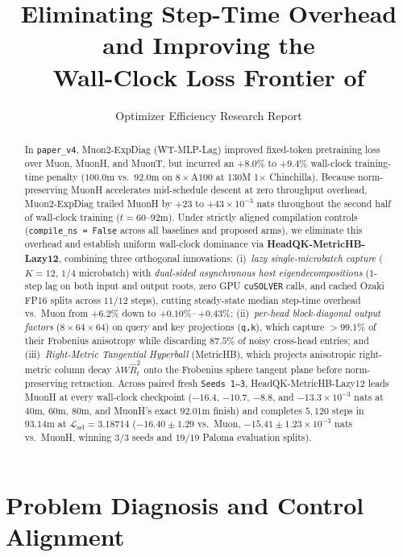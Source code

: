 \documentclass[11pt]{article}
\title{Eliminating Step-Time Overhead and Improving the\\Wall-Clock Loss Frontier of \mname{Muon2-ExpDiag}}
\author{Optimizer Efficiency Research Report}
\newcommand{\Lsel}{\mathcal{L}_{\mathrm{sel}}}
\newcommand{\mname}[1]{#1}
\begin{document}
\maketitle

\begin{abstract}
In \texttt{paper\_v4}, \mname{Muon2-ExpDiag} (\mname{WT-MLP-Lag}) improved fixed-token pretraining loss over \mname{Muon}, \mname{MuonH}, and \mname{MuonT}, but incurred an $+8.0\%$ to $+9.4\%$ wall-clock training-time penalty ($100.0\text{m}$ vs.\ $92.0\text{m}$ on $8\times\text{A100}$ at 130M 1$\times$ Chinchilla). Because norm-preserving \mname{MuonH} accelerates mid-schedule descent at zero throughput overhead, \mname{Muon2-ExpDiag} trailed \mname{MuonH} by $+23$ to $+43\times 10^{-3}$ nats throughout the second half of wall-clock training ($t = 60\text{--}92\text{m}$). Under strictly aligned compilation controls (\texttt{compile\_ns = False} across all baselines and proposed arms), we eliminate this overhead and establish uniform wall-clock dominance via \textbf{\mname{HeadQK-MetricHB-Lazy12}}, combining three orthogonal innovations: (i)~\emph{lazy single-microbatch capture} ($K = 12$, $1/4$ microbatch) with \emph{dual-sided asynchronous host eigendecompositions} ($1$-step lag on both input and output roots, zero GPU \texttt{cuSOLVER} calls, and cached Ozaki FP16 splits across $11/12$ steps), cutting steady-state median step-time overhead vs.\ \mname{Muon} from $+6.2\%$ down to $+0.10\%$--\,$+0.43\%$; (ii)~\emph{per-head block-diagonal output factors} ($8\times 64\times 64$) on query and key projections (\texttt{q,k}), which capture $>99.1\%$ of their Frobenius anisotropy while discarding $87.5\%$ of noisy cross-head entries; and (iii)~\emph{Right-Metric Tangential Hyperball} (\mname{MetricHB}), which projects anisotropic right-metric column decay $\lambda W\hat{R}_t^2$ onto the Frobenius sphere tangent plane before norm-preserving retraction. Across paired fresh \texttt{Seeds 1--3}, \mname{HeadQK-MetricHB-Lazy12} leads \mname{MuonH} at every wall-clock checkpoint ($-16.4$, $-10.7$, $-8.8$, and $-13.3\times 10^{-3}$ nats at $40\text{m}$, $60\text{m}$, $80\text{m}$, and \mname{MuonH}'s exact $92.01\text{m}$ finish) and completes $5{,}120$ steps in $93.14\text{m}$ at $\Lsel = \mathbf{3.18714}$ ($\mathbf{-16.40 \pm 1.29}$ vs.\ \mname{Muon}, $\mathbf{-15.41 \pm 1.23}\times 10^{-3}$ nats vs.\ \mname{MuonH}, winning $3/3$ seeds and $19/19$ Paloma evaluation splits).
\end{abstract}

\section{Problem Diagnosis and Control Alignment}
\label{sec:diagnosis}
\end{document}
